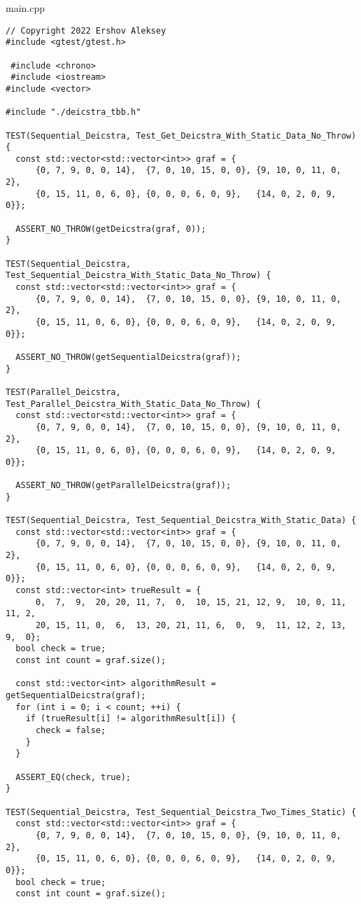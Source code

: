 \documentclass{report}
\begin{document}
main.cpp
\begin{lstlisting}
// Copyright 2022 Ershov Aleksey
#include <gtest/gtest.h>

 #include <chrono>
 #include <iostream>
#include <vector>

#include "./deicstra_tbb.h"

TEST(Sequential_Deicstra, Test_Get_Deicstra_With_Static_Data_No_Throw) {
  const std::vector<std::vector<int>> graf = {
      {0, 7, 9, 0, 0, 14},  {7, 0, 10, 15, 0, 0}, {9, 10, 0, 11, 0, 2},
      {0, 15, 11, 0, 6, 0}, {0, 0, 0, 6, 0, 9},   {14, 0, 2, 0, 9, 0}};

  ASSERT_NO_THROW(getDeicstra(graf, 0));
}

TEST(Sequential_Deicstra, Test_Sequential_Deicstra_With_Static_Data_No_Throw) {
  const std::vector<std::vector<int>> graf = {
      {0, 7, 9, 0, 0, 14},  {7, 0, 10, 15, 0, 0}, {9, 10, 0, 11, 0, 2},
      {0, 15, 11, 0, 6, 0}, {0, 0, 0, 6, 0, 9},   {14, 0, 2, 0, 9, 0}};

  ASSERT_NO_THROW(getSequentialDeicstra(graf));
}

TEST(Parallel_Deicstra, Test_Parallel_Deicstra_With_Static_Data_No_Throw) {
  const std::vector<std::vector<int>> graf = {
      {0, 7, 9, 0, 0, 14},  {7, 0, 10, 15, 0, 0}, {9, 10, 0, 11, 0, 2},
      {0, 15, 11, 0, 6, 0}, {0, 0, 0, 6, 0, 9},   {14, 0, 2, 0, 9, 0}};

  ASSERT_NO_THROW(getParallelDeicstra(graf));
}

TEST(Sequential_Deicstra, Test_Sequential_Deicstra_With_Static_Data) {
  const std::vector<std::vector<int>> graf = {
      {0, 7, 9, 0, 0, 14},  {7, 0, 10, 15, 0, 0}, {9, 10, 0, 11, 0, 2},
      {0, 15, 11, 0, 6, 0}, {0, 0, 0, 6, 0, 9},   {14, 0, 2, 0, 9, 0}};
  const std::vector<int> trueResult = {
      0,  7,  9,  20, 20, 11, 7,  0,  10, 15, 21, 12, 9,  10, 0, 11, 11, 2,
      20, 15, 11, 0,  6,  13, 20, 21, 11, 6,  0,  9,  11, 12, 2, 13, 9,  0};
  bool check = true;
  const int count = graf.size();

  const std::vector<int> algorithmResult = getSequentialDeicstra(graf);
  for (int i = 0; i < count; ++i) {
    if (trueResult[i] != algorithmResult[i]) {
      check = false;
    }
  }

  ASSERT_EQ(check, true);
}

TEST(Sequential_Deicstra, Test_Sequential_Deicstra_Two_Times_Static) {
  const std::vector<std::vector<int>> graf = {
      {0, 7, 9, 0, 0, 14},  {7, 0, 10, 15, 0, 0}, {9, 10, 0, 11, 0, 2},
      {0, 15, 11, 0, 6, 0}, {0, 0, 0, 6, 0, 9},   {14, 0, 2, 0, 9, 0}};
  bool check = true;
  const int count = graf.size();


\end{lstlisting}
\end{document}
